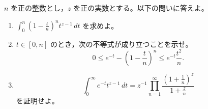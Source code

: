 \documentclass[12pt]{jlreq}
\begin{document}
\(n\) を正の整数とし，\(z\) を正の実数とする。以下の問いに答えよ。

\begin{enumerate}
  \item \(\displaystyle \int_0^n \left(1-\frac{t}{n}\right)^n t^{z-1}\,dt\) を求めよ。
  \item \(t\in[0,n]\) のとき，次の不等式が成り立つことを示せ。
  \[
    0\le e^{-t}-\left(1-\frac{t}{n}\right)^n
      \le e^{-t}\frac{t^2}{n}.
  \]
  \item
  \[
    \int_0^\infty e^{-t}t^{z-1}\,dt
      =z^{-1}\prod_{n=1}^{\infty}\frac{\left(1+\frac1n\right)^z}{1+\frac{z}{n}}
  \]
  を証明せよ。
\end{enumerate}
\end{document}
